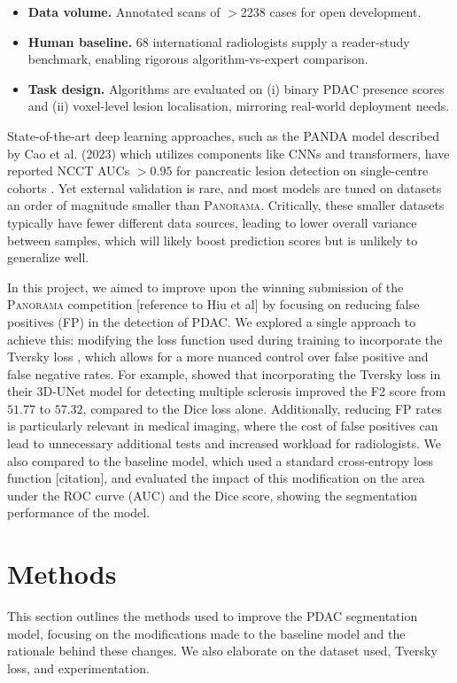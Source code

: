 \documentclass[conference]{IEEEtran}
\begin{document}
\begin{itemize}[leftmargin=*]
  \item \textbf{Data volume.} Annotated scans of $>$2238 cases for open development.
  \item \textbf{Human baseline.} 68 international radiologists supply a reader-study benchmark, enabling rigorous algorithm-vs-expert comparison.
  \item \textbf{Task design.} Algorithms are evaluated on (i) binary PDAC presence scores and (ii) voxel-level lesion localisation, mirroring real-world deployment needs.
\end{itemize}

State-of-the-art deep learning approaches, such as the PANDA model described by Cao et al. (2023) which utilizes components like CNNs and transformers, have reported NCCT AUCs $>0.95$ for pancreatic lesion detection on single-centre cohorts \cite{b9}. Yet external validation is rare, and most models are tuned on datasets an order of magnitude smaller than \textsc{Panorama}. Critically, these smaller datasets typically have fewer different data sources, leading to lower overall variance between samples, which will likely boost prediction scores but is unlikely to generalize well.

In this project, we aimed to improve upon the winning submission of the \textsc{Panorama} competition [reference to Hiu et al] by focusing on reducing false positives (FP) in the detection of PDAC. We explored a single approach to achieve this: modifying the loss function used during training to incorporate the Tversky loss \cite{b10}, which allows for a more nuanced control over false positive and false negative rates. For example, \cite{Salehi 2017 DOI: 10.1007/978-3-319-67389-9_44} showed that incorporating the Tversky loss in their 3D-UNet model for detecting multiple sclerosis improved the F2 score from $51.77$ to $57.32$, compared to the Dice loss alone. Additionally, reducing FP rates is particularly relevant in medical imaging, where the cost of false positives can lead to unnecessary additional tests and increased workload for radiologists. We also compared to the baseline model, which used a standard cross-entropy loss function [citation], and evaluated the impact of this modification on the area under the ROC curve (AUC) and the Dice score, showing the segmentation performance of the model.

\section{Methods}
This section outlines the methods used to improve the PDAC segmentation model, focusing on the modifications made to the baseline model and the rationale behind these changes. We also elaborate on the dataset used, Tversky loss, and experimentation. 
\end{document}
